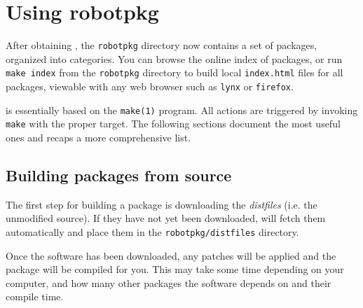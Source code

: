%
%
%
%
%

\section{Using robotpkg} %

After obtaining \robotpkg, the  {\tt robotpkg} directory now  contains a set of
packages, organized   into  categories.  You can   browse  the online  index of
packages, or run {\tt  make index} from the {\tt  robotpkg} directory to  build
local {\tt index.html}  files for all  packages, viewable with any web  browser
such as {\tt lynx} or {\tt firefox}.

\robotpkg is  essentially based on the  {\tt make(1)} program.  All actions are
triggered by invoking {\tt make} with the proper target. The following sections
document          the           most          useful          ones          and
 recaps a more
comprehensive list.


\subsection{Building packages from source} %

The  first step for  building  a  package  is  downloading the {\em  distfiles}
(i.e. the unmodified  source). If they have not  yet been downloaded, \robotpkg
will  fetch them automatically  and place them  in the {\tt robotpkg/distfiles}
directory.

Once the software  has  been downloaded,  any  patches will be applied  and the
package will  be compiled for  you.  This may  take some time depending on your
computer, and how many other packages the software depends on and their compile
time.

